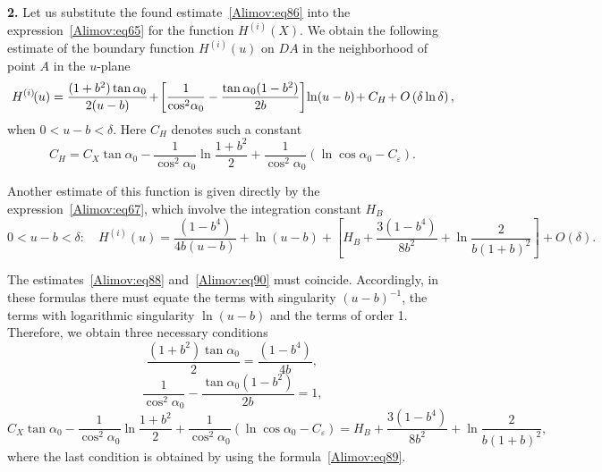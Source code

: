 \documentclass[
11pt,%
tightenlines,%
twoside,%
onecolumn,%
nofloats,%
nobibnotes,%
nofootinbib,%
superscriptaddress,%
noshowpacs,%
centertags]%
{revtex4-2}
\begin{document}
\textbf{2.} Let us substitute the found estimate~\eqref{Alimov:eq86} into the
expression~\eqref{Alimov:eq65} for the function $H^{(i)}(X)$. We obtain the following estimate of
the boundary function $H^{(i)}(u)$ on $DA$ in the neighborhood of point $A$ in the $u$-plane
\begin{equation}
\label{Alimov:eq88} H^{(i)}\hspace{-0.5mm}(u) = \frac{(1 + b^2)\tan \alpha_0}{2(u -
b)}\hspace{-0.5mm} + \hspace{-0.5mm}\left[ {\frac{1}{\cos^2\hspace{-0.5mm}\alpha_0} - \frac{\tan
\alpha_0 (1 - b^2)}{2b}} \right]\hspace{-0.5mm}\ln(u - b)\hspace{-0.5mm} + C_H \hspace{-0.5mm}+
O\left( {\delta \ln \delta } \right),
\end{equation}
when $0 < u - b < \delta$.  Here $C_H $ denotes such a constant
\begin{equation}
\label{Alimov:eq89} C_H = C_X \tan \alpha_0 - \frac{1}{\cos^2\alpha_0 }\ln \frac{1 + b^2}{2} +
\frac{1}{\cos^2\alpha_0 }\left( {\ln \cos \alpha_0 - C_\varepsilon } \right).
\end{equation}

Another estimate of this function is given directly by the expression~\eqref{Alimov:eq67}, which
involve the integration constant $H_B$
\begin{equation}
\label{Alimov:eq90} 0 < u - b < \delta : \quad H^{(i)}(u) = \frac{(1 - b^4)}{4b(u - b)} + \ln (u -
b) + \left[ {H_B + \frac{3(1 - b^4)}{8b^2} + \ln \frac{2}{b(1 + b)^2}} \right] + O(\delta).
\end{equation}

The estimates~\eqref{Alimov:eq88} and~\eqref{Alimov:eq90} must coincide. Accordingly, in these
formulas there must equate the terms with singularity $(u - b)^{-1}$, the terms with logarithmic
singularity $\ln (u - b)$ and the terms of order 1. Therefore, we obtain three necessary conditions
\begin{equation}
\label{Alimov:eq91} \frac{(1 + b^2)\tan \alpha_0 }{2} = \frac{(1 - b^4)}{4b},
\end{equation}
\begin{equation}
\label{Alimov:eq92} \frac{1}{\cos^2\alpha_0 } - \frac{\tan \alpha_0 (1 - b^2)}{2b} = 1,
\end{equation}
\begin{equation}
\label{Alimov:eq93} C_X \tan \alpha_0 - \frac{1}{\cos^2\alpha_0 }\ln \frac{1 + b^2}{2} +
\frac{1}{\cos^2\alpha_0 }\left( {\ln \cos \alpha_0 - C_\varepsilon } \right) = H_B + \frac{3(1 -
b^4)}{8b^2} + \ln \frac{2}{b(1 + b)^2},
\end{equation}
where the last condition is obtained by using the formula~\eqref{Alimov:eq89}.
\end{document}
